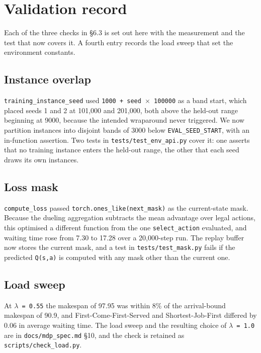 \appendix
\section{Validation record}\label{fault-forensics}

Each of the three checks in §6.3 is set out here with the measurement and the test that now
covers it. A fourth entry records the load sweep that set the environment constants.

\subsection{Instance overlap}\label{training-instances-overlapped-the-held-out-range}

\texttt{training\_instance\_seed} used \texttt{1000\ +\ seed\ $\times$\ 100000} as a band start, which placed seeds 1 and 2 at
101,000 and 201,000, both above the held-out range beginning at 9000, because the intended
wraparound never triggered. We now partition instances into disjoint bands of 3000 below
\texttt{EVAL\_SEED\_START}, with an in-function assertion. Two tests in
\texttt{tests/test\_env\_api.py} cover it: one asserts that no training instance enters
the held-out range, the other that each seed draws its own instances.

\subsection{Loss mask}\label{the-loss-used-an-all-ones-current-state-mask}

\texttt{compute\_loss} passed \texttt{torch.ones\_like(next\_mask)} as the current-state mask. Because the dueling
aggregation subtracts the mean advantage over legal actions, this optimised a different function
from the one \texttt{select\_action} evaluated, and waiting time rose from 7.30 to 17.28 over a 20,000-step run. The replay buffer now stores
the current mask, and a test in \texttt{tests/test\_mask.py} fails if the predicted
\texttt{Q(s,a)} is computed with any mask other than the current one.

\subsection{Load sweep}\label{the-environment-had-no-headroom}

At \texttt{$\lambda$\ =\ 0.55} the makespan of 97.95 was within 8\% of the arrival-bound makespan of 90.9, and
First-Come-First-Served and Shortest-Job-First differed by 0.06 in average waiting time. The load
sweep and the resulting choice of \texttt{$\lambda$\ =\ 1.0} are in \texttt{docs/mdp\_spec.md} §10, and the check is retained
as \texttt{scripts/check\_load.py}.

